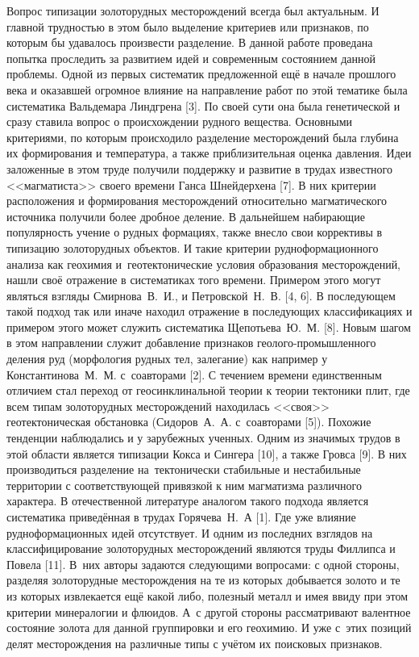  

\makeProcTitle
{}

Вопрос типизации золоторудных месторождений всегда был актуальным. И главной трудностью в этом было выделение критериев или признаков, по которым бы удавалось произвести разделение. В данной работе проведана попытка проследить за развитием идей и современным состоянием данной проблемы. Одной из первых систематик предложенной ещё в начале прошлого века и оказавшей огромное влияние на направление работ по этой тематике была систематика Вальдемара Линдгрена [3]. По своей сути она была генетической и сразу ставила вопрос о происхождении рудного вещества.  Основными критериями, по которым происходило разделение месторождений была глубина их формирования и температура, а также приблизительная оценка давления. Идеи заложенные в этом труде получили поддержку и развитие в трудах известного <<магматиста>> своего времени Ганса Шнейдерхена [7]. В них критерии расположения и формирования месторождений относительно магматического источника получили более дробное деление.  В дальнейшем набирающие популярность учение о рудных формациях, также внесло свои коррективы в типизацию золоторудных объектов. И такие критерии рудноформационного анализа как геохимия и~геотектонические условия образования месторождений, нашли своё отражение в систематиках того времени. Примером этого могут являться взгляды Смирнова~В.~И., и Петровской~Н.~В. [4, 6]. В последующем такой подход так или иначе находил отражение в последующих классификациях и примером этого может служить систематика Щепотьева~Ю.~М. [8].  Новым шагом в этом направлении служит добавление признаков геолого-промышленного деления руд (морфология рудных тел, залегание) как например у Константинова~М.~М. с~соавторами [2]. С течением времени единственным отличием стал переход от геосинклинальной теории к теории тектоники плит, где всем типам золоторудных месторождений находилась <<своя>> геотектоническая обстановка (Сидоров~А.~А. с~соавторами [5]). Похожие тенденции наблюдались и у зарубежных ученных. Одним из значимых трудов в этой области является типизации Кокса и Сингера [10], а также Гровса [9]. В них производиться разделение на~тектонически стабильные и нестабильные территории с соответствующей привязкой к ним магматизма различного характера. В отечественной литературе аналогом такого подхода является систематика приведённая в трудах Горячева~Н.~А [1]. Где уже влияние рудноформационных идей отсутствует. И одним из последних взглядов на классифицирование золоторудных месторождений являются труды Филлипса и Повела [11]. В~них авторы задаются следующими вопросами: с одной стороны, разделяя золоторудные месторождения на те из которых добывается золото и те из которых извлекается ещё какой либо, полезный металл и имея ввиду при этом критерии минералогии и флюидов. А~с другой стороны рассматривают валентное состояние золота для данной группировки и его геохимию. И уже с~этих позиций делят месторождения на различные типы с учётом их поисковых признаков. 